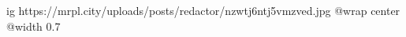 
 
 
 
 

\ifcmt
  ig https://mrpl.city/uploads/posts/redactor/nzwtj6ntj5vmzved.jpg
  @wrap center
  @width 0.7
\fi
